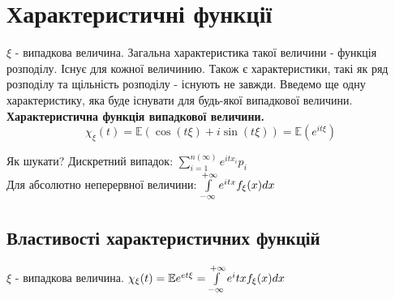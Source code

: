 \section{Характеристичні функції}

$\xi$ - випадкова величина. Загальна характеристика такої величини - функція розподілу. Існує для кожної величинию. Також є характеристики, такі як ряд розподілу та щільність розподілу - існують не завжди. Введемо ще одну характеристику, яка буде існувати для будь-якої випадкової величини.\\
\bd
\textbf{Характеристична функція випадкової величини.}
$$
\chi_ \xi (t) = \mathbb{E}(\cos{(t \xi)} + i \sin{(t \xi)}   ) =  \mathbb{E}( e^{ it \xi})
$$
\begin{center}
\end{center}
\ed
Як шукати? Дискретний випадок: $  \sum\limits_{i = 1}^{ n(\infty)}{ e^{itx_i}p_i}$\\
Для абсолютно неперервної величини: $  \int\limits_{-\infty}^{ +\infty}{ e^{itx}f_ \xi (x)dx}$

\subsection{Властивості характеристичних функцій}

$\xi$ - випадкова величина. $\chi_ \xi(t) = \mathbb{E} e^{et \xi} =  \int\limits_{-\infty}^{ +\infty}{ e^itx f_{\xi}(x)dx}$\\

